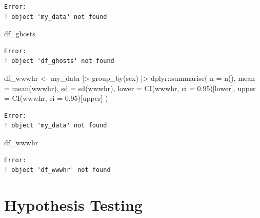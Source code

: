 \documentclass[
  letterpaper,
  DIV=11,
  numbers=noendperiod]{scrartcl}
\newenvironment{Shaded}{\begin{snugshade}}{\end{snugshade}}
\newcommand{\AttributeTok}[1]{\textcolor[rgb]{0.40,0.45,0.13}{#1}}
\newcommand{\FloatTok}[1]{\textcolor[rgb]{0.68,0.00,0.00}{#1}}
\newcommand{\FunctionTok}[1]{\textcolor[rgb]{0.28,0.35,0.67}{#1}}
\newcommand{\NormalTok}[1]{\textcolor[rgb]{0.00,0.23,0.31}{#1}}
\newcommand{\OtherTok}[1]{\textcolor[rgb]{0.00,0.23,0.31}{#1}}
\newcommand{\SpecialCharTok}[1]{\textcolor[rgb]{0.37,0.37,0.37}{#1}}
\newcommand{\StringTok}[1]{\textcolor[rgb]{0.13,0.47,0.30}{#1}}
\begin{document}
\begin{verbatim}
Error:
! object 'my_data' not found
\end{verbatim}

\begin{Shaded}
\begin{Highlighting}[]
\NormalTok{df\_ghosts}
\end{Highlighting}
\end{Shaded}

\begin{verbatim}
Error:
! object 'df_ghosts' not found
\end{verbatim}

\begin{Shaded}
\begin{Highlighting}[]
\NormalTok{df\_wwwhr }\OtherTok{\textless{}{-}}\NormalTok{ my\_data }\SpecialCharTok{|\textgreater{}}
  \FunctionTok{group\_by}\NormalTok{(sex) }\SpecialCharTok{|\textgreater{}}
\NormalTok{  dplyr}\SpecialCharTok{::}\FunctionTok{summarise}\NormalTok{(}
    \AttributeTok{n =} \FunctionTok{n}\NormalTok{(),}
    \AttributeTok{mean =} \FunctionTok{mean}\NormalTok{(wwwhr),}
    \AttributeTok{sd =} \FunctionTok{sd}\NormalTok{(wwwhr),}
    \AttributeTok{lower =} \FunctionTok{CI}\NormalTok{(wwwhr, }\AttributeTok{ci =} \FloatTok{0.95}\NormalTok{)[}\StringTok{\textquotesingle{}lower\textquotesingle{}}\NormalTok{],}
    \AttributeTok{upper  =} \FunctionTok{CI}\NormalTok{(wwwhr, }\AttributeTok{ci =} \FloatTok{0.95}\NormalTok{)[}\StringTok{\textquotesingle{}upper\textquotesingle{}}\NormalTok{]}
\NormalTok{    )}
\end{Highlighting}
\end{Shaded}

\begin{verbatim}
Error:
! object 'my_data' not found
\end{verbatim}

\begin{Shaded}
\begin{Highlighting}[]
\NormalTok{df\_wwwhr}
\end{Highlighting}
\end{Shaded}

\begin{verbatim}
Error:
! object 'df_wwwhr' not found
\end{verbatim}

\section{Hypothesis Testing}\label{hypothesis-testing}
\end{document}
